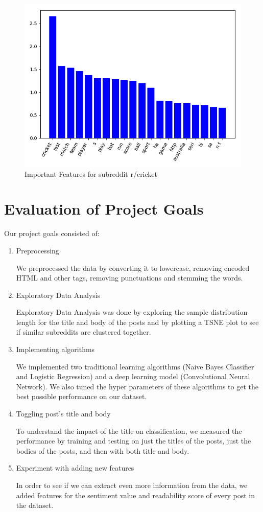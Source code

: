 \documentclass{sig-alternate-05-2015}
\begin{document}
\begin{figure}[H]
\centering
\includegraphics[width=\linewidth]{plots/coefficients-cricket-dim-200.png}
\caption{Important Features for subreddit r/cricket}
\end{figure}

\section{Evaluation of Project Goals}

Our project goals consisted of:
\begin{enumerate}
    \item Preprocessing

            We preprocessed the data by converting it to lowercase, removing encoded HTML and other tags, removing punctuations and stemming the words.
    \item Exploratory Data Analysis

            Exploratory Data Analysis was done by exploring the sample distribution length for the title and body of the posts and by plotting a TSNE plot to see if similar subreddits are clustered together.
    \item Implementing algorithms

            We implemented two traditional learning algorithms (Naive Bayes Classifier and Logistic Regression) and a deep learning model (Convolutional Neural Network). We also tuned the hyper parameters of these algorithms to get the best possible performance on our dataset.
    \item Toggling post's title and body

            To understand the impact of the title on classification, we measured the performance by training and testing on just the titles of the posts, just the bodies of the posts, and then with both title and body.
    \item Experiment with adding new features

            In order to see if we can extract even more information from the data, we added features for the sentiment value and readability score of every post in the dataset.

\end{enumerate}
\end{document}
